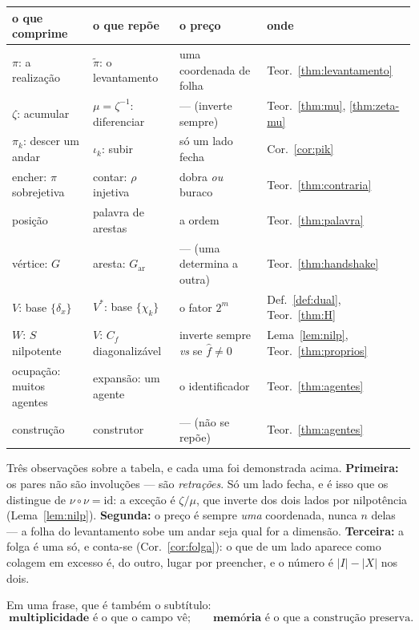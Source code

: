 \documentclass[11pt,a4paper]{article}
\newcommand{\abs}[1]{\lvert #1\rvert}
\begin{document}
\begin{center}\footnotesize
\begin{tabular}{@{}llll@{}}
\toprule
o que comprime & o que repõe & o preço & onde \\
\midrule
$\pi$: a realização & $\tilde\pi$: o levantamento & uma coordenada de folha & Teor.~\ref{thm:levantamento} \\
$\zeta$: acumular & $\mu=\zeta^{-1}$: diferenciar & --- (inverte sempre) & Teor.~\ref{thm:mu}, \ref{thm:zeta-mu} \\
$\pi_k$: descer um andar & $\iota_k$: subir & só um lado fecha & Cor.~\ref{cor:pik} \\
encher: $\pi$ sobrejetiva & contar: $\rho$ injetiva & dobra \emph{ou} buraco & Teor.~\ref{thm:contraria} \\
posição & palavra de arestas & a ordem & Teor.~\ref{thm:palavra} \\
vértice: $G$ & aresta: $G_{\mathrm{ar}}$ & --- (uma determina a outra) & Teor.~\ref{thm:handshake} \\
$V$: base $\{\delta_x\}$ & $V^{*}$: base $\{\chi_k\}$ & o fator $2^{m}$ & Def.~\ref{def:dual}, Teor.~\ref{thm:H} \\
$W$: $S$ nilpotente & $V$: $C_f$ diagonalizável & inverte sempre \emph{vs} se $\widehat f\neq0$ & Lema~\ref{lem:nilp}, Teor.~\ref{thm:proprios} \\
ocupação: muitos agentes & expansão: um agente & o identificador & Teor.~\ref{thm:agentes} \\
construção & construtor & --- (não se repõe) & Teor.~\ref{thm:agentes} \\
\bottomrule
\end{tabular}
\end{center}

\medskip\noindent Três observações sobre a tabela, e cada uma foi demonstrada
acima. \textbf{Primeira:} os pares não são involuções --- são \emph{retrações}.
Só um lado fecha, e é isso que os distingue de $\nu\circ\nu=\mathrm{id}$: a
exceção é $\zeta/\mu$, que inverte dos dois lados por nilpotência
(Lema~\ref{lem:nilp}). \textbf{Segunda:} o preço é sempre \emph{uma} coordenada,
nunca $n$ delas --- a folha do levantamento sobe um andar seja qual for a
dimensão. \textbf{Terceira:} a folga é uma só, e conta-se
(Cor.~\ref{cor:folga}): o que de um lado aparece como colagem em excesso é, do
outro, lugar por preencher, e o número é $\abs{I}-\abs{X}$ nos dois.

\medskip\noindent Em uma frase, que é também o subtítulo:
\[
\boxed{\ \textbf{multiplicidade} \text{ é o que o campo vê};\qquad
\textbf{memória} \text{ é o que a construção preserva.}\ }
\]
\end{document}
